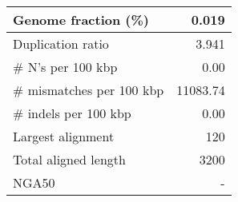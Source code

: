 \documentclass[12pt,a4paper]{article}
\begin{document}
\begin{table}[ht]
\begin{center}
\begin{tabular}{|l*{1}{|r}|}
Genome fraction (\%) & 0.019 \\ \hline
Duplication ratio & 3.941 \\ \hline
\# N's per 100 kbp & 0.00 \\ \hline
\# mismatches per 100 kbp & 11083.74 \\ \hline
\# indels per 100 kbp & 0.00 \\ \hline
Largest alignment & 120 \\ \hline
Total aligned length & 3200 \\ \hline
NGA50 & - \\ \hline
\end{tabular}
\end{center}
\end{table}
\end{document}
